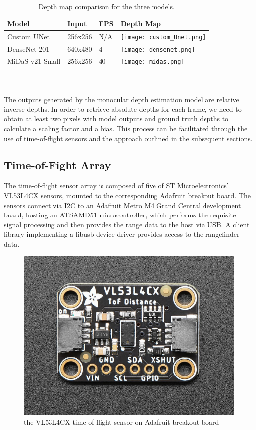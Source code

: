 \documentclass[conference]{IEEEtran}
\begin{document}
\\
\begin{table}[htbp]
\centering
\caption{Depth map comparison for the three models.}
\label{tab:model_comparison}
\small %
\begin{tabular}{|p{1.4cm}|p{1.2cm}|p{1cm}| p{4.0cm}|}
\hline
\textbf{Model} & \textbf{Input} & \textbf{FPS} & \textbf{Depth Map} \\
\hline
Custom UNet & 256x256 & N/A &  \texttt{[image: custom\_Unet.png]} \\ \hline
DenseNet-201 & 640x480 & 4  & \texttt{[image: densenet.png]} \\ \hline
MiDaS v21 Small & 256x256 & 40  & \texttt{[image: midas.png]} \\ \hline
\end{tabular}
\end{table}
\\
\\
The outputs generated by the monocular depth estimation model are relative inverse depths. In order to retrieve absolute depths for each frame, we need to obtain at least two pixels with model outputs and ground truth depths to calculate a scaling factor and a bias. This process can be facilitated through the use of time-of-flight sensors and the approach outlined in the subsequent sections.
\FloatBarrier
\subsection{Time-of-Fight Array}
The time-of-flight sensor array is composed of five of ST Microelectronics'
VL53L4CX sensors, mounted to the corresponding Adafruit breakout board. The
sensors connect via I2C to an Adafruit Metro M4 Grand Central development
board, hosting an ATSAMD51 microcontroller, which performs the requisite signal
processing and then provides the range data to the host via USB. A client
library implementing a libusb device driver provides access to the rangefinder
data.

\begin{figure}
\centering
\includegraphics[scale=0.31]{vl53l4cx-adafruit.png}
\caption{the VL53L4CX time-of-flight sensor on Adafruit breakout board}
\label{fig:vl53l4cx}
\end{figure}
\end{document}
